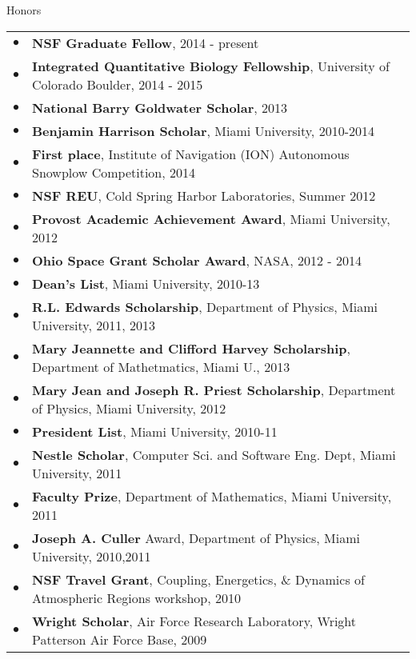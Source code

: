 \documentclass{resume} %
\begin{document}
\begin{rSection}{Honors}
  \begin{tabular}{ll}
    $\bullet$ & \textbf{NSF Graduate Fellow}, 2014 - present\\
    $\bullet$ & \textbf{Integrated Quantitative Biology Fellowship}, University of Colorado Boulder, 2014 - 2015\\
    $\bullet$ & \textbf{National Barry Goldwater Scholar}, 2013\\
    $\bullet$ & \textbf{Benjamin Harrison Scholar}, Miami University, 2010-2014\\
    $\bullet$ & \textbf{First place}, Institute of Navigation (ION) Autonomous Snowplow Competition, 2014\\
    $\bullet$ & \textbf{NSF REU}, Cold Spring Harbor Laboratories, Summer 2012\\
    $\bullet$ & \textbf{Provost Academic Achievement Award}, Miami University, 2012\\
    $\bullet$ & \textbf{Ohio Space Grant Scholar Award}, NASA, 2012 - 2014\\
    $\bullet$ & \textbf{Dean's List}, Miami University, 2010-13\\
    $\bullet$ & \textbf{R.L. Edwards Scholarship}, Department of Physics, Miami University, 2011, 2013\\
    $\bullet$ & \textbf{Mary Jeannette and Clifford Harvey Scholarship}, Department of Mathetmatics, Miami U., 2013\\
    $\bullet$ & \textbf{Mary Jean and Joseph R. Priest Scholarship}, Department of Physics, Miami University, 2012\\
    $\bullet$ & \textbf{President List}, Miami University, 2010-11\\
    $\bullet$ & \textbf{Nestle Scholar}, Computer Sci. and Software Eng. Dept, Miami University, 2011\\
    $\bullet$ & \textbf{Faculty Prize}, Department of Mathematics, Miami University, 2011\\
    $\bullet$ & \textbf{Joseph A. Culler} Award, Department of Physics, Miami University, 2010,2011\\
    $\bullet$ & \textbf{NSF Travel Grant}, Coupling, Energetics, \& Dynamics of Atmospheric Regions workshop, 2010\\
    $\bullet$ & \textbf{Wright Scholar}, Air Force Research Laboratory, Wright Patterson Air Force Base, 2009\\
  \end{tabular}
\end{rSection}
\end{document}
